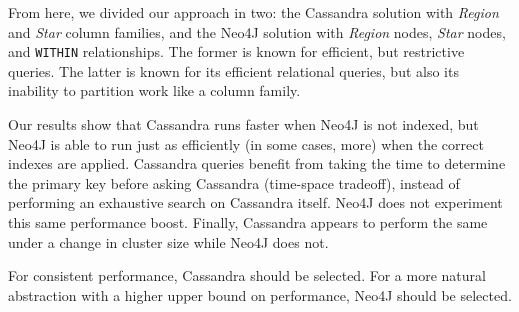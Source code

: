 From here, we divided our approach in two: the Cassandra solution with \textit{Region} and \textit{Star} column
families, and the Neo4J solution with \textit{Region} nodes, \textit{Star} nodes, and \texttt{WITHIN} relationships.
The former is known for efficient, but restrictive queries.
The latter is known for its efficient relational queries, but also its inability to partition work like a column family.

Our results show that Cassandra runs faster when Neo4J is not indexed, but Neo4J is able to run just as efficiently
(in some cases, more) when the correct indexes are applied.
Cassandra queries benefit from taking the time to determine the primary key before asking Cassandra (time-space
tradeoff), instead of performing an exhaustive search on Cassandra itself.
Neo4J does not experiment this same performance boost.
Finally, Cassandra appears to perform the same under a change in cluster size while Neo4J does not.

For consistent performance, Cassandra should be selected.
For a more natural abstraction with a higher upper bound on performance, Neo4J should be selected.
